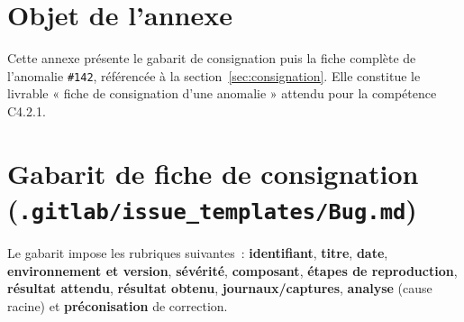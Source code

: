 \label{chap:annexe-fiche-anomalie}
\section*{Objet de l'annexe}
Cette annexe présente le gabarit de consignation puis la fiche complète de l'anomalie \texttt{\#142}, référencée à la section~\ref*{sec:consignation}. Elle constitue le livrable « fiche de consignation d'une anomalie » attendu pour la compétence C4.2.1.

\section*{Gabarit de fiche de consignation (\texttt{.gitlab/issue\_templates/Bug.md})}
Le gabarit impose les rubriques suivantes~: \textbf{identifiant}, \textbf{titre}, \textbf{date}, \textbf{environnement et version}, \textbf{sévérité}, \textbf{composant}, \textbf{étapes de reproduction}, \textbf{résultat attendu}, \textbf{résultat obtenu}, \textbf{journaux/captures}, \textbf{analyse} (cause racine) et \textbf{préconisation} de correction.


